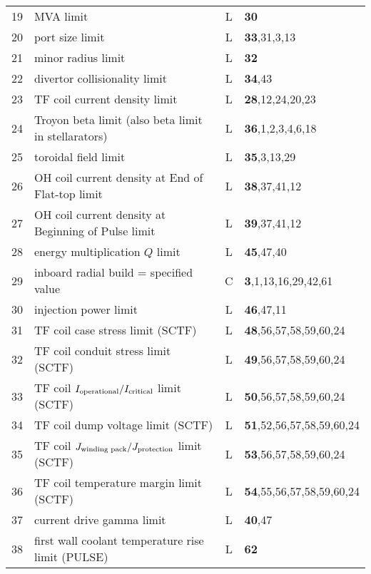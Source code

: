 \documentclass[11pt,a4paper]{report}
\begin{document}
\begin{table}[tbph]
\begin{center}
\begin{tabular}{||c|l|c|l||}
19  & MVA limit                                           & L    & {\bf 30} \\
20  & port size limit                                     & L    & {\bf 33},31,3,13 \\
21  & minor radius limit                                  & L    & {\bf 32} \\
22  & divertor collisionality limit                       & L    & {\bf 34},43 \\
23  & TF coil current density limit                       & L    & {\bf 28},12,24,20,23 \\
24  & Troyon beta limit (also beta limit in stellarators) & L    & {\bf 36},1,2,3,4,6,18 \\
25  & toroidal field limit                                & L    & {\bf 35},3,13,29 \\
26  & OH coil current density at End of Flat-top limit    & L    & {\bf 38},37,41,12 \\
27  & OH coil current density at Beginning of Pulse limit & L    & {\bf 39},37,41,12 \\
28  & energy multiplication $Q$ limit                     & L    & {\bf 45},47,40 \\
29  & inboard radial build = specified value              & C    & {\bf 3},1,13,16,29,42,61 \\
30  & injection power limit                               & L    & {\bf 46},47,11 \\
31  & TF coil case stress limit (SCTF)                    & L    & {\bf 48},56,57,58,59,60,24 \\
32  & TF coil conduit stress limit (SCTF)                 & L    & {\bf 49},56,57,58,59,60,24 \\
33  & TF coil $I_{\mbox{\scriptsize operational}}/
I_{\mbox{\scriptsize critical}}$ limit (SCTF)             & L    & {\bf 50},56,57,58,59,60,24 \\
34  & TF coil dump voltage limit (SCTF)                   & L    & {\bf 51},52,56,57,58,59,60,24 \\
35  & TF coil $J_{\mbox{\scriptsize winding pack}}/
J_{\mbox{\scriptsize protection}}$ limit (SCTF)           & L    & {\bf 53},56,57,58,59,60,24 \\
36  & TF coil temperature margin limit (SCTF)             & L    & {\bf 54},55,56,57,58,59,60,24 \\
37  & current drive gamma limit                           & L    & {\bf 40},47 \\
38  & first wall coolant temperature rise limit (PULSE)   & L    & {\bf 62} \\

\end{tabular}
\end{center}
\end{table}
\end{document}
